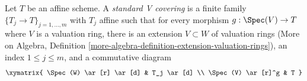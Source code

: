 \begin{definition}
\label{definition-standard-V-covering}
Let $T$ be an affine scheme. A {\it standard V covering} is a finite family
$\{T_j \to T\}_{j = 1, \ldots, m}$ with $T_j$ affine
such that for every morphism $g : \Spec(V) \to T$ where $V$
is a valuation ring, there is an extension $V \subset W$ of valuation rings
(More on Algebra, Definition
\ref{more-algebra-definition-extension-valuation-rings}),
an index $1 \leq j \leq m$, and a commutative diagram
$$
\xymatrix{
\Spec(W) \ar[r] \ar[d] & T_j \ar[d] \\
\Spec(V) \ar[r]^g & T
}
$$
\end{definition}